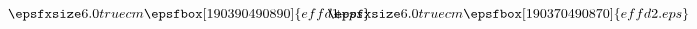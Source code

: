 \begin{equation}\label{One-Loop_Effective_Diagrams_Picture}
\qquad \smash{\epsfxsize6.0truecm\epsfbox[190 390 490 890]{effd1.eps}}
\hspace{-1cm}
+ \hspace{-0.5cm}
\smash{\epsfxsize6.0truecm\epsfbox[190 370 490 870]{effd2.eps}}
\end{equation}

